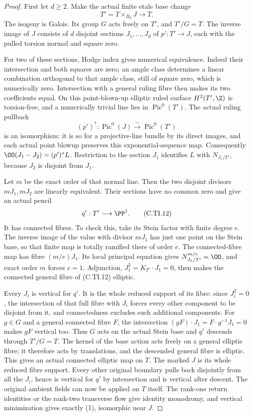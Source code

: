 \begin{proof}
First let \(d\ge2\). Make the actual
finite etale base change
\[
 T'=T\times_{B_0}J\longrightarrow T.
 \tag{C.TI.10}
\]
The isogeny is Galois. Its group \(G\)
acts freely on \(T'\), and \(T'/G=T\).
The inverse image of \(J\) consists of
\(d\) disjoint sections \(J_1,\ldots,J_d\)
of \(p':T'\to J\), each with the pulled
torsion normal and square zero.

For two of these sections, Hodge index
gives numerical equivalence. Indeed their
intersection and both squares are zero;
an ample class determines a linear
combination orthogonal to that ample
class, still of square zero, which is
numerically zero. Intersection with a
general ruling fibre then makes its two
coefficients equal. On this point-blown-up
elliptic ruled surface \(H^2(T',\Z)\) is
torsion-free, and a numerically trivial
line lies in \(\operatorname{Pic}^0(T')\).
The actual ruling pullback
\[
        (p')^*:\operatorname{Pic}^0(J)
                       \xrightarrow{\sim}\operatorname{Pic}^0(T')
 \tag{C.TI.11}
\]
is an isomorphism: it is so for a
projective-line bundle by its direct
images, and each actual point blowup
preserves this exponential-sequence map.
Consequently
\(\OO(J_1-J_2)=(p')^*L\). Restriction to
the section \(J_1\) identifies \(L\)
with \(N_{J_1/T'}\), because \(J_2\)
is disjoint from \(J_1\).

Let \(m\) be the exact order of that
normal line. Then the two disjoint
divisors \(mJ_1,mJ_2\) are linearly
equivalent. Their sections have no
common zero and give an actual pencil
\[
                  q':T'\longrightarrow\PP^1.
 \tag{C.TI.12}
\]
It has connected fibres. To check this,
take its Stein factor with finite degree
\(e\). The inverse image of the value
with divisor \(mJ_1\) has just one
point on the Stein base, so that finite
map is totally ramified there of
order \(e\). The connected-fibre map
has fibre \((m/e)J_1\). Its local
principal equation gives
\(N_{J_1/T'}^{m/e}=\OO\), and exact
order \(m\) forces \(e=1\).
Adjunction, \(J_1^2=K_{T'}\cdot J_1=0\),
then makes the connected general fibre
of (C.TI.12) elliptic.

Every \(J_i\) is vertical for \(q'\).
It is the whole reduced support of
its fibre: since \(J_i^2=0\), the
intersection of that full fibre
with \(J_i\) forces every other
component to be disjoint from it,
and connectedness excludes such
additional components.
For \(g\in G\) and a general connected
fibre \(F\), the intersection
\((gF)\cdot J_1=F\cdot g^{-1}J_1=0\)
makes \(gF\) vertical too. Thus \(G\)
acts on the actual Stein base and
\(q'\) descends through \(T'/G=T\).
The kernel of the base action acts
freely on a general elliptic fibre;
it therefore acts by translations,
and the descended general fibre
is elliptic. This gives an actual
connected elliptic map on \(T\).
The marked \(J\) is its whole reduced
fibre support. Every other original
boundary pulls back disjointly from
all the \(J_i\), hence is vertical
for \(q'\) by intersection and is
vertical after descent. The original
ambient fields can now be applied
on \(T\) itself. The rank-one return
identities or the rank-two transverse
flow give identity monodromy, and
vertical minimization gives exactly
(1), isomorphic near \(J\).


\end{proof}
